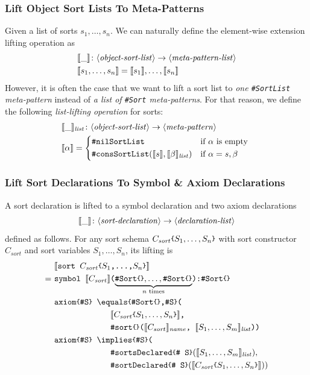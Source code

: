 \documentclass[UTF8,11pt]{article}
\theoremstyle{plain}
\theoremstyle{definition}
\theoremstyle{remark}
\newcommand{\parametric}[2]{{#1}\raisebox{.2ex}{\texttt{\footnotesize{\{}}}#2\raisebox{.2ex}{\texttt{\footnotesize{\}}}}}
\newcommand{\denote}[1]{\llbracket{#1}\rrbracket}
\newcommand{\sharpsymbol}{\#}
\newcommand{\KSort}{\texttt{\sharpsymbol Sort}}
\newcommand{\Ksort}{\texttt{\sharpsymbol sort}}
\newcommand{\KSortList}{\texttt{\sharpsymbol SortList}}
\newcommand{\KnilKSortList}{\texttt{\sharpsymbol nilSortList}}
\newcommand{\KconsKSortList}{\texttt{\sharpsymbol consSortList}}
\newcommand{\KsortDeclared}{\texttt{\sharpsymbol sortDeclared}}
\newcommand{\KsortsDeclared}{\texttt{\sharpsymbol sortsDeclared}}
\newcommand{\name}{\mathit{name}}
\newcommand{\llist}{\mathit{list}}
\newcommand{\slashsymbol}{\symbol{92}}
\newcommand{\slsh}[1]{\texttt{\slashsymbol#1}}
\newcommand{\slimplies}{\slsh{implies}}
\newcommand{\slequals}{\slsh{equals}}
\newcommand{\itsort}{\mathit{sort}}
\newcommand{\syntacc}[1]{\text{$\langle$\textit{#1}$\rangle$}}
\begin{document}
\subsubsection{Lift Object Sort Lists To Meta-Patterns}
Given a list of sorts $s_1,\dots,s_n$.
We can naturally define the element-wise extension lifting operation as
\begin{align*}
&\denote{\_} \colon \syntacc{object-sort-list} \to \syntacc{meta-pattern-list} 
\\
&\denote{s_1,\dots,s_n} = \denote{s_1},\dots,\denote{s_n}
\end{align*}
However, it is often the case that we want to lift a sort list to \emph{one 
\textup{\KSortList} meta-pattern} instead of \emph{a list of \textup{\KSort} 
meta-patterns}.
For that reason, we define the following \emph{list-lifting operation} for 
sorts:
\begin{align*}
& \denote{\_}_\llist \colon \syntacc{object-sort-list} \to 
\syntacc{meta-pattern} \\
& \denote{\alpha} = 
\begin{cases*}
\KnilKSortList & if $\alpha$ is empty \\
\KconsKSortList(\denote{s},\denote{\beta}_\llist) & if $\alpha = s,\beta$
\end{cases*}
\end{align*}

\subsubsection{Lift Sort Declarations To Symbol \& Axiom Declarations}
A sort declaration is lifted to a symbol declaration and two axiom declarations
$$ \denote{\_} \colon \syntacc{sort-declaration} \to 
\syntacc{declaration-list}$$
defined as follows.
For any sort schema $\parametric{C_\itsort}{S_1,\dots,S_n}$
with sort constructor $C_\itsort$ and sort variables $S_1,\dots,S_n$, 
its lifting is
\begin{align*}
  &\ \denote{\texttt{sort \parametric{$C_\itsort$}{$S_1$,\dots,$S_n$}}} \\
  = &\ \texttt{symbol 
  $\denote{C_\itsort}$($\underbrace{\parametric{
  		\KSort}{},\dots,\parametric{\KSort}{}}_\textrm{$n$ 
  		times}$):\parametric{\KSort}{}}
  \\
  &\ \texttt{\parametric{axiom}{\sharpsymbol S} 
  \parametric{\slequals}{\parametric{\KSort}{},\sharpsymbol S}(}
  \\
  &\qquad\qquad\qquad\quad
  \texttt{$\denote{\parametric{C_\itsort}{S_1,\dots,S_n}}$,}
  \\
  &\qquad\qquad\qquad\quad
  \texttt{\parametric{\Ksort}{}($\denote{C_\itsort}_\name$, 
  $\denote{
  	S_1,\dots,S_m}_\llist$))}
  \\
  &\ 
  \texttt{\parametric{axiom}{\sharpsymbol S}
  \parametric{\slimplies}{\sharpsymbol S}( }
  \\
  &\qquad\qquad\qquad\quad
  \parametric{\KsortsDeclared}{\texttt{\sharpsymbol 
  		S}}(\denote{
  	S_1,\dots,S_m}_\llist),
  \\
  &\qquad\qquad\qquad\quad
  \parametric{\KsortDeclared}{\texttt{\sharpsymbol 
  S}}(\denote{\parametric{C_\itsort}{S_1,\dots,S_n}}))
\end{align*}
\end{document}
